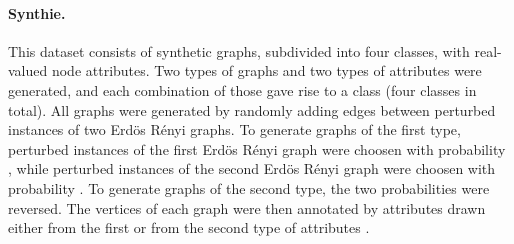 \documentclass[twoside,11pt]{article}
\begin{document}
\paragraph{Synthie.} This dataset consists of  synthetic graphs, subdivided into four classes, with  real-valued node attributes.
Two types of graphs and two types of attributes were generated, and each combination of those gave rise to a class (four classes in total).
All graphs were generated by randomly adding edges between  perturbed instances of two Erd{\"o}s R{\'e}nyi graphs.
To generate graphs of the first type, perturbed instances of the first Erd{\"o}s R{\'e}nyi graph were choosen with probability , while perturbed instances of the second Erd{\"o}s R{\'e}nyi graph were choosen with probability .
To generate graphs of the second type, the two probabilities were reversed.
The vertices of each graph were then annotated by attributes drawn either from the first or from the second type of attributes .
\end{document}
